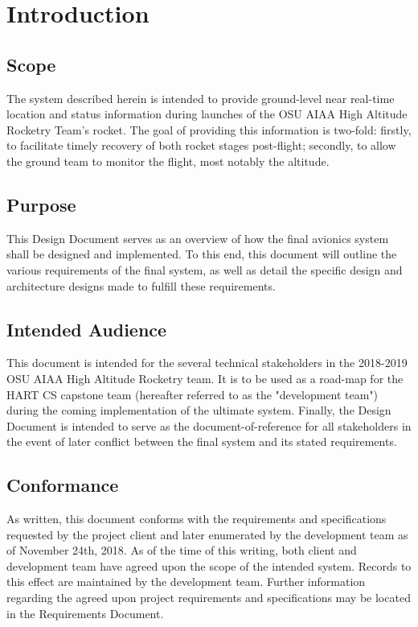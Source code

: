 \documentclass[onecolumn, draftclsnofoot,10pt, compsoc]{IEEEtran}
\begin{document}
\section{Introduction}

\subsection{Scope}
The system described herein is intended to provide ground-level near real-time location and status information during launches of the OSU AIAA High Altitude Rocketry Team's rocket.
The goal of providing this information is two-fold: firstly, to facilitate timely recovery of both rocket stages post-flight; secondly, to allow the ground team to monitor the flight, most notably the altitude.

\subsection{Purpose}
This Design Document serves as an overview of how the final avionics system shall be designed and implemented.
To this end, this document will outline the various requirements of the final system, as well as detail the specific design and architecture designs made to fulfill these requirements.

\subsection{Intended Audience}
This document is intended for the several technical stakeholders in the 2018-2019 OSU AIAA High Altitude Rocketry team.
It is to be used as a road-map for the HART CS capstone team (hereafter referred to as the "development team") during the coming implementation of the ultimate system.
Finally, the Design Document is intended to serve as the document-of-reference for all stakeholders in the event of later conflict between the final system and its stated requirements.

\subsection{Conformance}
As written, this document conforms with the requirements and specifications requested by the project client and later enumerated by the development team as of November 24th, 2018.
As of the time of this writing, both client and development team have agreed upon the scope of the intended system.
Records to this effect are maintained by the development team.
Further information regarding the agreed upon project requirements and specifications may be located in the Requirements Document.
\end{document}
